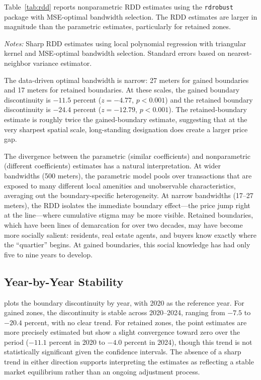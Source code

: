 \documentclass[12pt]{article}
\begin{document}
Table~\ref{tab:rdd} reports nonparametric RDD estimates using the \texttt{rdrobust} package with MSE-optimal bandwidth selection. The RDD estimates are larger in magnitude than the parametric estimates, particularly for retained zones.



\noindent\textit{Notes:} Sharp RDD estimates using local polynomial regression with triangular kernel and MSE-optimal bandwidth selection. Standard errors based on nearest-neighbor variance estimator.

The data-driven optimal bandwidth is narrow: 27 meters for gained boundaries and 17 meters for retained boundaries. At these scales, the gained boundary discontinuity is $-11.5$ percent ($z = -4.77$, $p < 0.001$) and the retained boundary discontinuity is $-24.4$ percent ($z = -12.79$, $p < 0.001$). The retained-boundary estimate is roughly twice the gained-boundary estimate, suggesting that at the very sharpest spatial scale, long-standing designation does create a larger price gap.

The divergence between the parametric (similar coefficients) and nonparametric (different coefficients) estimates has a natural interpretation. At wider bandwidths (500 meters), the parametric model pools over transactions that are exposed to many different local amenities and unobservable characteristics, averaging out the boundary-specific heterogeneity. At narrow bandwidths (17--27 meters), the RDD isolates the immediate boundary effect---the price jump right at the line---where cumulative stigma may be more visible. Retained boundaries, which have been lines of demarcation for over two decades, may have become more socially salient: residents, real estate agents, and buyers know exactly where the ``quartier'' begins. At gained boundaries, this social knowledge has had only five to nine years to develop.

\subsection{Year-by-Year Stability}

 plots the boundary discontinuity by year, with 2020 as the reference year. For gained zones, the discontinuity is stable across 2020--2024, ranging from $-7.5$ to $-20.4$ percent, with no clear trend. For retained zones, the point estimates are more precisely estimated but show a slight convergence toward zero over the period ($-11.1$ percent in 2020 to $-4.0$ percent in 2024), though this trend is not statistically significant given the confidence intervals. The absence of a sharp trend in either direction supports interpreting the estimates as reflecting a stable market equilibrium rather than an ongoing adjustment process.
\end{document}
